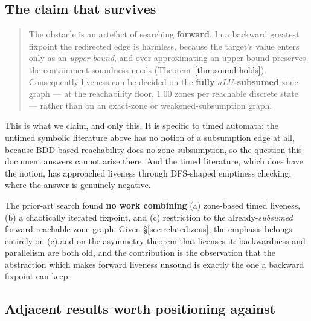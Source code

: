 \subsection{The claim that survives}

\begin{quote}
The obstacle is an artefact of searching \textbf{forward}. In a backward greatest fixpoint the
redirected edge is harmless, because the target's value enters only as an \emph{upper bound}, and
over-approximating an upper bound preserves the containment soundness needs
(Theorem~\ref{thm:sound-holds}). Consequently liveness can be decided on the \textbf{fully
$aLU$-subsumed} zone graph --- at the reachability floor, $1.00$ zones per reachable discrete state
--- rather than on an exact-zone or weakened-subsumption graph.
\end{quote}

This is what we claim, and only this. It is specific to timed automata: the untimed symbolic
literature above has no notion of a subsumption edge at all, because BDD-based reachability does no
zone subsumption, so the question this document answers cannot arise there. And the timed
literature, which does have the notion, has approached liveness through DFS-shaped emptiness
checking, where the answer is genuinely negative.

The prior-art search found \textbf{no work combining} (a) zone-based timed liveness, (b) a
chaotically iterated fixpoint, and (c) restriction to the already-\emph{subsumed}
forward-reachable zone graph. Given \S\ref{sec:related:zeus}, the emphasis belongs entirely on
(c) and on the asymmetry theorem that licenses it: backwardness and parallelism are both old, and
the contribution is the observation that the abstraction which makes forward liveness unsound is
exactly the one a backward fixpoint can keep.

\subsection{Adjacent results worth positioning against}

